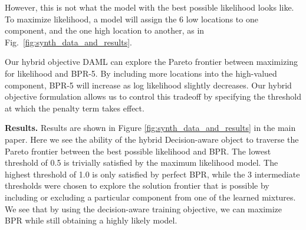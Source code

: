 However, this is not what the model with the best possible likelihood looks like. To maximize likelihood, a model will assign the 6 low locations to one component, and the one high location to another, as in Fig.~\ref{fig:synth_data_and_results}.

Our hybrid objective DAML can explore the Pareto frontier between maximizing for likelihood and BPR-5. By including more locations into the high-valued component, BPR-5 will increase as log likelihood slightly decreases. Our hybrid objective formulation allows us to control this tradeoff by specifying the threshold at which the penalty term takes effect.




\textbf{Results.}
Results are shown in Figure \ref{fig:synth_data_and_results} in the main paper. Here we see the ability of the hybrid Decision-aware object to traverse the Pareto frontier between the best possible likelihood and BPR. The lowest threshold of 0.5 is trivially satisfied by the maximum likelihood model. The highest threshold of 1.0 is only satisfied by perfect BPR, while the 3 intermediate thresholds were chosen to explore the solution frontier that is possible by including or excluding a particular component from one of the learned mixtures. We see that by using the decision-aware training objective, we can maximize BPR while still obtaining a highly likely model.